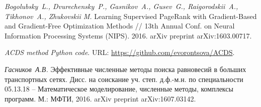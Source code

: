 \documentclass[11pt]{article}
\begin{document}
\begin{thebibliography}{99}
		

		\textit{Bogolubsky~L., Dvurechensky~P., Gasnikov~A., Gusev~G., Raigorodskii~A., Tikhonov~A., Zhukovskii M.}
		Learning Supervised PageRank with Gradient-Based and Gradient-Free Optimization Methods // 13th Annual Conf. on Neural Information Processing Systems (NIPS). 2016.
		arXiv preprint %
		arXiv:1603.00717.

		\textit{ACDS method Python code}. URL: \url{https://github.com/evorontsova/ACDS}.
		
		
		\textit{Гасников~А.В.}
		Эффективные численные методы поиска равновесий в больших транспортных сетях. Дисс. на соискание уч. степ. д.ф.-м.н. по специальности 05.13.18 – Математическое моделирование, численные методы, комплексы программ. М.: МФТИ, 2016. 
		arXiv preprint %
		arXiv:1607.03142. 
		
		\end{thebibliography}
		



		
\end{document}
